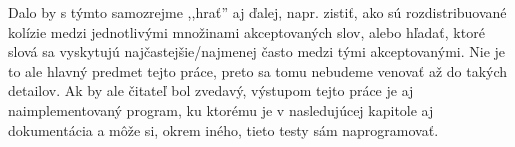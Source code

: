 Dalo by s týmto samozrejme ,,hrať'' aj ďalej, napr. zistiť, ako sú rozdistribuované kolízie medzi jednotlivými množinami akceptovaných slov, alebo hľadať, ktoré slová sa vyskytujú najčastejšie/najmenej často medzi tými akceptovanými. Nie je to ale hlavný predmet tejto práce, preto sa tomu nebudeme venovať až do takých detailov. Ak by ale čitateľ bol zvedavý, výstupom tejto práce je aj naimplementovaný program, ku ktorému je v nasledujúcej kapitole aj dokumentácia a môže si, okrem iného, tieto testy sám naprogramovať.


